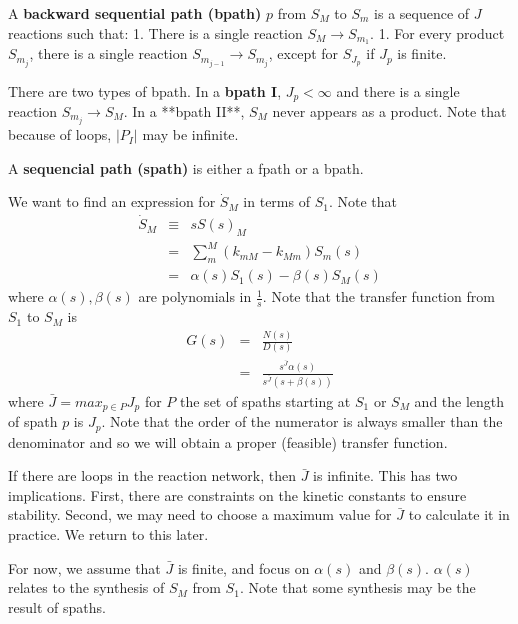 \documentclass[unnumsec,webpdf,contemporary,large]{oup-authoring-template}%
\theoremstyle{thmstyleone}%
\theoremstyle{thmstyletwo}%
\theoremstyle{thmstylethree}%
\begin{document}
A \textbf{backward sequential path (bpath)} $p$ from $S_M$ to $S_m$ is a sequence of $J$ reactions such that:
  1. There is a single reaction $S_M \rightarrow S_{m_1}$.
  1. For every product $S_{m_j}$, there is a single reaction $S_{m_{j-1}} \rightarrow S_{m_j}$, except for $S_{J_p}$ if $J_p$ is finite.

There are two types of bpath. In a \textbf{bpath I}, $J_p < \infty$ and there is a single reaction $S_{m_j} \rightarrow S_M$. In a **bpath II**, $S_M$ never appears as a product. Note that because of loops, $|P_I|$ may be infinite.

A \textbf{sequencial path (spath)} is either a fpath or a bpath.

We want to find an expression for $\dot{S}_M$ in terms of $S_1$.
Note that
\begin{eqnarray}
\dot{S}_M
& \equiv & s S(s)_M \\
& = & \sum_m^M (k_{mM} - k_{Mm}) S_{m}(s) \\
& = & \alpha(s) S_1 (s) - \beta(s) S_M(s)
\end{eqnarray}
where $\alpha(s), \beta(s)$ are polynomials in $\frac{1}{s}$. Note that the transfer function from $S_1$ to $S_M$ is
\begin{eqnarray}
G(s) &=& \frac{N(s)}{D(s)} \\
& = & \frac{s^{\bar{J}}\alpha(s)}{s^{\bar{J}} (s + \beta(s))}
\end{eqnarray}
where $\bar{J} = max_{p \in P} J_p$ for $P$ the set of spaths starting at $S_1$ or $S_M$ and the length of spath $p$ is $J_p$. Note that the order of the numerator is always smaller than the denominator and so we will obtain a proper (feasible) transfer function.

If there are loops in the reaction network, then $\bar{J}$ is infinite. This has two implications. First, there are constraints on the kinetic constants to ensure stability. Second, we may need to choose a maximum value for $\bar{J}$ to calculate it in practice. We return to this later.

For now, we assume that $\bar{J}$ is finite, and focus on $\alpha(s)$ and $\beta(s)$. $\alpha(s)$ relates to the synthesis of $S_M$ from $S_1$. Note that some synthesis may be the result of spaths.
\end{document}
